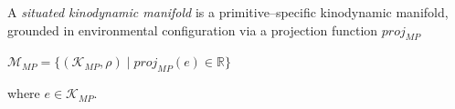 \begin{definition}\label{def:situated-manifold}
A \textsl{situated kinodynamic manifold} is a primitive--specific kinodynamic manifold, grounded in environmental configuration via a projection function $proj_{MP}$
\begin{center}
$\mathcal{M}_{MP} = \{(\mathcal{K}_{MP}, \rho) \mid proj_{MP}(e) \in \mathbb{R}\}$
\end{center}
where $e \in \mathcal{K}_{MP}$.
\end{definition}